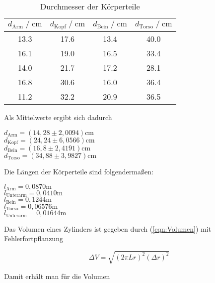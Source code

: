 \begin{table}
  \centering
    \caption{Durchmesser der Körperteile}
    \label{tab:durchmesser}
    \begin{tabular}{c c c c}
    \toprule
    $d_\text{Arm} \;/\; \si{\centi\meter}$ & $d_\text{Kopf} \;/\; \si{\centi\meter}$ & $d_\text{Bein} \;/\; \si{\centi\meter}$ & $d_\text{Torso} \;/\; \si{\centi\meter}$ \\
    \midrule
    13.3 & 17.6 & 13.4 & 40.0 \\
    16.1 & 19.0 & 16.5 & 33.4 \\
    14.0 & 21.7 & 17.2 & 28.1 \\
    16.8 & 30.6 & 16.0 & 36.4 \\
    11.2 & 32.2 & 20.9 & 36.5 \\
    \bottomrule
  \end{tabular}
\end{table}

Als Mittelwerte ergibt sich dadurch
\begin{center}
  $d_{\text{Arm}} = (14,28 \pm 2,0094)\si{\centi\meter}$ \\
  $d_{\text{Kopf}} = (24,24 \pm 6,0566)\si{\centi\meter}$ \\
  $d_{\text{Bein}} = (16,8 \pm 2,4191)\si{\centi\meter}$ \\
  $d_{\text{Torso}} = (34,88 \pm 3,9827)\si{\centi\meter}$ \\ 
\end{center}


Die Längen der Körperteile sind folgendermaßen:
\begin{center}
  $l_{\text{Arm}} = 0,0870 \si{\meter}$ \\
  $l_{\text{Unterarm}} = 0,0410 \si{\meter}$ \\
  $l_{\text{Bein}} = 0,1244 \si{\meter}$ \\
  $l_{\text{Torso}} = 0,06576 \si{\meter}$ \\
  $l_{\text{Unterarm}} = 0,01644 \si{\meter}$ \\
\end{center}


Das Volumen eines Zylinders ist gegeben durch (\autoref{eqn:Volumen}) mit Fehlerfortpflanzung

\begin{equation}
  \Delta V = \sqrt{(2 \pi Lr)^2 (\Delta r)^2}
\end{equation}

Damit erhält man für die Volumen

